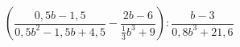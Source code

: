 \begin{ex}[type=expression]
	\begin{condition}
		\( \left( \dfrac{0,5b-1,5}{0,5b^2-1,5b+4,5}-\dfrac{2b-6}{\frac{1}{3}b^3+9} \right):\dfrac{b-3}{0,8b^3+21,6} \)
	\end{condition}
\end{ex}